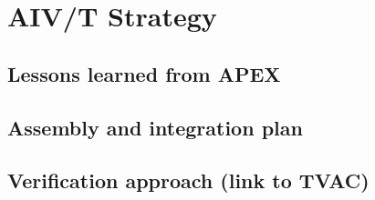 \chapter{AIV/T Strategy}
\label{ch:aivt}
\section{Lessons learned from APEX}

\section{Assembly and integration plan}

\section{Verification approach (link to TVAC)}
